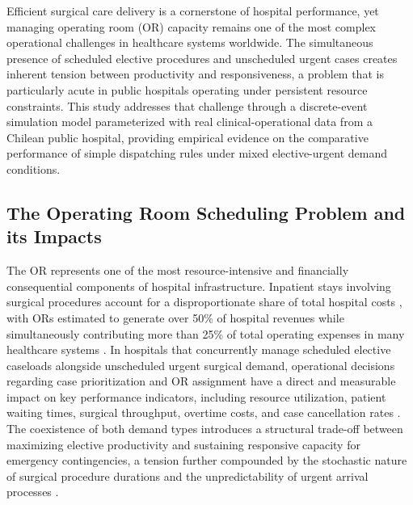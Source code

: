 \documentclass[sn-mathphys-num]{sn-jnl}
\begin{document}
Efficient surgical care delivery is a cornerstone of hospital performance,
yet managing operating room (OR) capacity remains one of the most complex
operational challenges in healthcare systems worldwide. The simultaneous
presence of scheduled elective procedures and unscheduled urgent cases
creates inherent tension between productivity and responsiveness, a problem
that is particularly acute in public hospitals operating under persistent
resource constraints. This study addresses that challenge through a
discrete-event simulation model parameterized with real clinical-operational
data from a Chilean public hospital, providing empirical evidence on the
comparative performance of simple dispatching rules under mixed elective-urgent
demand conditions.

\subsection{The Operating Room Scheduling Problem and its Impacts}

The OR represents one of the most resource-intensive and
financially consequential components of hospital infrastructure. Inpatient
stays involving surgical procedures account for a disproportionate share of
total hospital costs \cite{mcdermott2021overview}, with ORs estimated to generate
over 50\% of hospital revenues while simultaneously contributing more than
25\% of total operating expenses in many healthcare systems \cite{macario2010does}.
In hospitals that concurrently manage scheduled elective caseloads alongside
unscheduled urgent surgical demand, operational decisions regarding case
prioritization and OR assignment have a direct and measurable impact on key
performance indicators, including resource utilization, patient waiting times,
surgical throughput, overtime costs, and case cancellation rates
\cite{may2011surgical,lamiri2008stochastic}. The coexistence of both demand types introduces a
structural trade-off between maximizing elective productivity and sustaining
responsive capacity for emergency contingencies, a tension further compounded
by the stochastic nature of surgical procedure durations and the
unpredictability of urgent arrival processes \cite{gerchak1996reservation,may2011surgical}.
\end{document}
